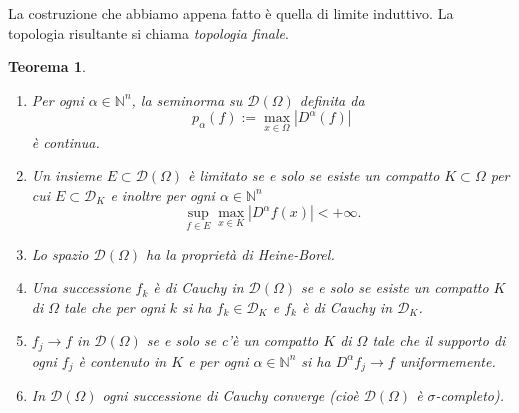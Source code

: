 \documentclass[italian,a4paper,oneside,headinclude]{scrbook}
\newcommand{\D}{\mathcal D}
\newcommand{\NN}{\mathbb N}
\newcommand{\abs}[1]{{\left|#1\right|}}
\newcommand{\defeq}{:=}
\newtheorem{theorem}{Teorema}
\begin{document}
La costruzione che abbiamo appena fatto è quella di limite
induttivo.
La topologia risultante si chiama \emph{topologia finale}.

\begin{theorem}
  \begin{enumerate}
  \item Per ogni $\alpha\in \NN^n$, la seminorma su $\D(\Omega)$
    definita da
    \[
    p_\alpha(f)\defeq \max_{x\in \Omega} \abs{D^\alpha(f)}
    \]
    è continua.

  \item Un insieme $E\subset \D(\Omega)$ è limitato se e solo se esiste
    un compatto $K\subset \Omega$ per cui $E\subset \D_K$ e inoltre
    per ogni $\alpha\in\NN^n$
    \[
    \sup_{f\in E} \max_{x\in K} \abs{D^\alpha f(x)} < +\infty.
    \]

  \item Lo spazio $\D(\Omega)$ ha la proprietà di Heine-Borel.

  \item Una successione $f_k$ è di Cauchy in $\D(\Omega)$ se e solo se
    esiste un compatto $K$ di $\Omega$ tale che
    per ogni $k$ si ha $f_k \in \D_K$  e $f_k$ è di Cauchy in $\D_K$.

  \item $f_j \to f $ in $\D(\Omega)$ se e solo se c'è un compatto $K$
    di $\Omega$ tale che il supporto di ogni $f_j$ è contenuto in
    $K$ e per ogni $\alpha\in \NN^n$ si ha $D^\alpha f_j\to f$
    uniformemente.

  \item In $\D(\Omega)$ ogni successione di Cauchy converge (cioè
    $\D(\Omega)$ è $\sigma$-completo).
  \end{enumerate}
\end{theorem}
%
\end{document}
